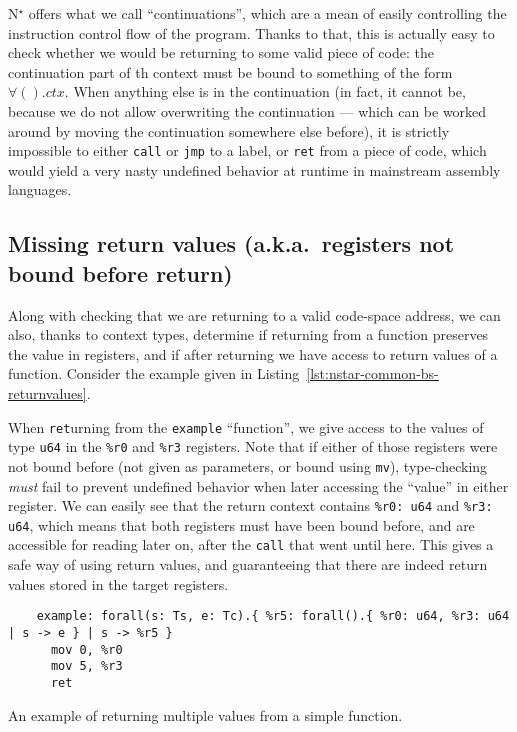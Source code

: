 N$^\star$ offers what we call ``continuations'', which are a mean of easily controlling the instruction control flow of the program.
Thanks to that, this is actually easy to check whether we would be returning to some valid piece of code: the continuation part of th context must be bound to something of the form $\forall().ctx$.
When anything else is in the continuation (in fact, it cannot be, because we do not allow overwriting the continuation --- which can be worked around by moving the continuation somewhere else before), it is strictly impossible to either \texttt{call} or \texttt{jmp} to a label, or \texttt{ret} from a piece of code, which would yield a very nasty undefined behavior at runtime in mainstream assembly languages.

\subsection{Missing return values (a.k.a.\ registers not bound before return)}\label{subsec:nstar-common-bs-restrictions-unboundregs}

Along with checking that we are returning to a valid code-space address, we can also, thanks to context types, determine if returning from a function preserves the value in registers, and if after returning we have access to return values of a function.
Consider the example given in Listing~\ref{lst:nstar-common-bs-returnvalues}.

When \texttt{ret}urning from the \texttt{example} ``function'', we give access to the values of type \texttt{u64} in the \texttt{\%r0} and \texttt{\%r3} registers.
Note that if either of those registers were not bound before (not given as parameters, or bound using \texttt{mv}), type-checking \textit{must} fail to prevent undefined behavior when later accessing the ``value'' in either register.
We can easily see that the return context contains \texttt{\%r0: u64} and \texttt{\%r3: u64}, which means that both registers must have been bound before, and are accessible for reading later on, after the \texttt{call} that went until here.
This gives a safe way of using return values, and guaranteeing that there are indeed return values stored in the target registers.

\begin{listing}[htb]
  \centering
  \begin{minipage}{0.90\textwidth}
    \begin{verbatim}
    example: forall(s: Ts, e: Tc).{ %r5: forall().{ %r0: u64, %r3: u64 | s -> e } | s -> %r5 }
      mov 0, %r0
      mov 5, %r3
      ret
    \end{verbatim}
  \end{minipage}
  \caption{An example of returning multiple values from a simple function.}
  \label{lst:nstar-common-bs-returnvalues}
\end{listing}

